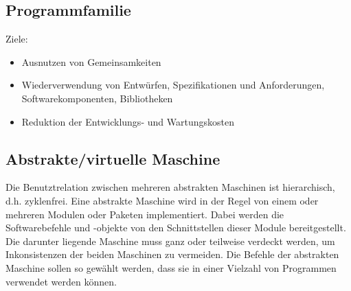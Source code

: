 \subsection{Programmfamilie}
Ziele:
\begin{itemize}
    \item Ausnutzen von Gemeinsamkeiten
    \item Wiederverwendung von Entwürfen, Spezifikationen und Anforderungen, Softwarekomponenten, Bibliotheken
    \item Reduktion der Entwicklungs- und Wartungskosten
\end{itemize}

\subsection{Abstrakte/virtuelle Maschine}
Die Benutztrelation zwischen mehreren abstrakten Maschinen ist hierarchisch, d.h. zyklenfrei.
Eine abstrakte Maschine wird in der Regel von einem oder mehreren Modulen oder Paketen implementiert. Dabei werden die Softwarebefehle und -objekte von den Schnittstellen dieser Module bereitgestellt.
Die darunter liegende Maschine muss ganz oder teilweise verdeckt werden, um Inkonsistenzen der beiden Maschinen zu vermeiden.
Die Befehle der abstrakten Maschine sollen so gewählt werden, dass sie in einer Vielzahl von Programmen verwendet werden können.